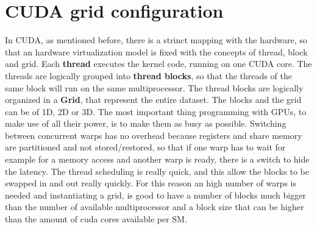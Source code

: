 \documentclass[a4paper]{article}
\begin{document}
\section{CUDA grid configuration}
\label{sec:grid}
In CUDA, as mentioned before, there is a strinct mapping with the hardware, so that an hardware virtualization model is fixed with the concepts of thread, block and grid.
Each \textbf{thread} executes the kernel code, running on one CUDA core.
The threads are logically grouped into \textbf{thread blocks}, so that the threads of the same block will run on the same multiprocessor. The thread blocks are logically organized in a \textbf{Grid}, that represent the entire dataset. The blocks and the grid can be of 1D, 2D or 3D.
The most important thing programming with GPUs, to make use of all their power, is to make them as busy as possible. Switching between concurrent warps has no overhead because registers and share memory are partitioned and not stored/restored, so that if one warp has to wait for example for a memory access and another warp is ready, there is a switch to hide the latency. The thread scheduling is really quick, and this allow the blocks to be swapped in and out really quickly. For this reason an high number of warps is needed and instantiating a grid, is good to have a number of blocks much bigger than the number of available multiprocessor and a block size that can be higher than the amount of cuda cores available per SM.
\end{document}
